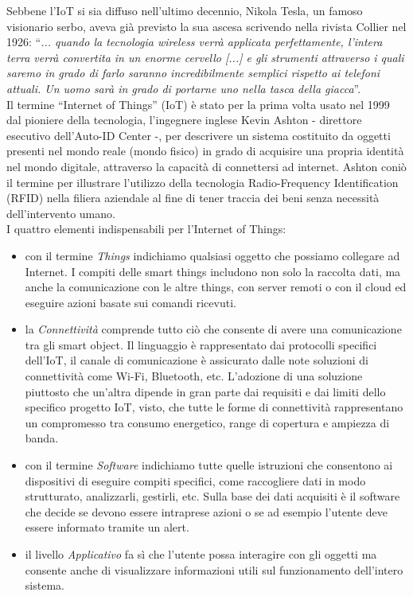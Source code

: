 \noindent Sebbene l'IoT si sia diffuso nell'ultimo decennio, Nikola Tesla, un famoso visionario serbo, aveva già previsto la sua ascesa scrivendo nella rivista Collier nel 1926: ``\textit{... quando la tecnologia wireless verrà applicata perfettamente, l'intera terra verrà convertita in un enorme cervello [...] e gli strumenti attraverso i quali saremo in grado di farlo saranno incredibilmente semplici rispetto ai telefoni attuali. Un uomo sarà in grado di portarne uno nella tasca della giacca}''.\\
Il termine ``Internet of Things'' (IoT) è stato per la prima volta usato nel 1999 dal pioniere della tecnologia, l'ingegnere inglese Kevin Ashton - direttore esecutivo dell'Auto-ID Center -, per descrivere un sistema costituito da oggetti presenti nel mondo reale (mondo fisico) in grado di acquisire una propria identità nel mondo digitale, attraverso la capacità di connettersi ad internet. Ashton coniò il termine per illustrare l'utilizzo della tecnologia Radio-Frequency Identification (RFID) nella filiera aziendale al fine di tener traccia dei beni senza necessità dell'intervento umano.\\

\noindent I quattro elementi indispensabili per l'Internet of Things: 
\begin{itemize}
    \item con il termine \textit{Things} indichiamo qualsiasi oggetto che possiamo collegare ad Internet. I compiti delle smart things includono non solo la raccolta dati, ma anche la comunicazione con le altre things, con server remoti o con il cloud ed eseguire azioni basate sui comandi ricevuti.
    
    \item la \textit{Connettività} comprende tutto ciò che consente di avere una comunicazione tra gli smart object. Il linguaggio è rappresentato dai protocolli specifici dell'IoT, il canale di comunicazione è assicurato dalle note soluzioni di connettività come Wi-Fi, Bluetooth, etc. L'adozione di una soluzione piuttosto che un'altra dipende in gran parte dai requisiti e dai limiti dello specifico progetto IoT, visto, che tutte le forme di connettività rappresentano un compromesso tra consumo energetico, range di copertura e ampiezza di banda. 
    
    \item con il termine \textit{Software} indichiamo tutte quelle istruzioni che consentono ai dispositivi di eseguire compiti specifici, come raccogliere dati in modo strutturato, analizzarli, gestirli, etc. Sulla base dei dati acquisiti è il software che decide se devono essere intraprese azioni o se ad esempio l'utente deve essere informato tramite un alert.
    
    \item il livello \textit{Applicativo} fa sì che l'utente possa interagire con gli oggetti ma consente anche di visualizzare informazioni utili sul funzionamento dell'intero sistema. 
\end{itemize}

